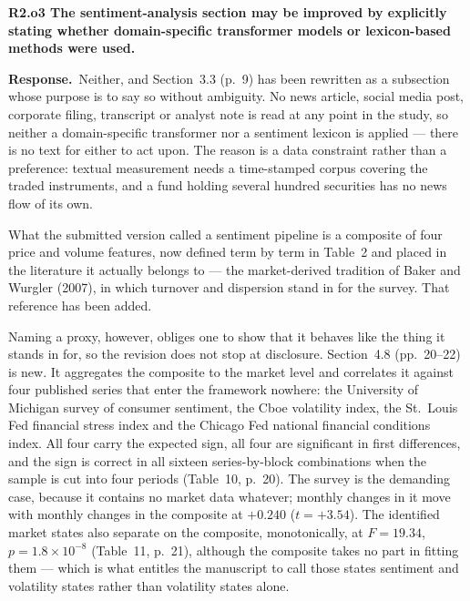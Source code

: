\documentclass[11pt,a4paper]{article}
\newcommand{\rc}[1]{\par\medskip\noindent\textbf{#1}\par\nopagebreak}
\newcommand{\resp}{\par\noindent\textbf{Response.}\ }
\begin{document}
\rc{R2.o3 The sentiment-analysis section may be improved by explicitly stating whether
domain-specific transformer models or lexicon-based methods were used.}

\resp Neither, and Section~3.3 (p.~9) has been rewritten as a subsection whose purpose
is to say so without ambiguity. No news article, social media post, corporate filing,
transcript or analyst note is read at any point in the study, so neither a
domain-specific transformer nor a sentiment lexicon is applied --- there is no text for
either to act upon. The reason is a data constraint rather than a preference: textual
measurement needs a time-stamped corpus covering the traded instruments, and a fund
holding several hundred securities has no news flow of its own.

What the submitted version called a sentiment pipeline is a composite of four price and
volume features, now defined term by term in Table~2 and placed in the literature it
actually belongs to --- the market-derived tradition of Baker and Wurgler (2007), in
which turnover and dispersion stand in for the survey. That reference has been added.

Naming a proxy, however, obliges one to show that it behaves like the thing it stands
in for, so the revision does not stop at disclosure. Section~4.8 (pp.~20--22) is new. It
aggregates the composite to the market level and correlates it against four published
series that enter the framework nowhere: the University of Michigan survey of consumer
sentiment, the Cboe volatility index, the St.~Louis Fed financial stress index and the
Chicago Fed national financial conditions index. All four carry the expected sign, all
four are significant in first differences, and the sign is correct in all sixteen
series-by-block combinations when the sample is cut into four periods (Table~10, p.~20).
The survey is the demanding case, because it contains no market data whatever; monthly
changes in it move with monthly changes in the composite at $+0.240$ ($t = +3.54$). The
identified market states also separate on the composite, monotonically, at $F = 19.34$,
$p = 1.8 \times 10^{-8}$ (Table~11, p.~21), although the composite takes no part in
fitting them --- which is what entitles the manuscript to call those states sentiment
and volatility states rather than volatility states alone.
\end{document}
